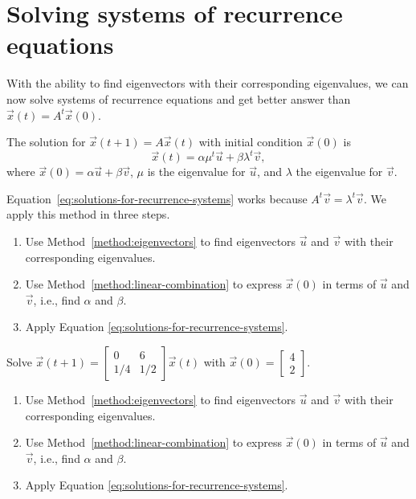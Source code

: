 \documentclass[../main.tex]{subfiles}
\begin{document}
 \section{Solving systems of recurrence equations}
With the ability to find eigenvectors with their corresponding eigenvalues, we can now solve systems of recurrence equations and get better answer than \(\vec{x}(t) = A^{t} \vec{x}(0)\).

\begin{method} \label{method:recurrences-system}
  The solution for \(\vec{x}(t + 1) = A\vec{x}(t)\) with initial condition \(\vec{x}(0)\) is
  \begin{equation} \label{eq:solutions-for-recurrence-systems}
    \vec{x}(t) = \alpha \mu^{t} \vec{u} + \beta \lambda^{t} \vec{v},
  \end{equation}
  where \(\vec{x}(0) = \alpha \vec{u} + \beta \vec{v}\), \(\mu\) is the eigenvalue for \(\vec{u}\), and \(\lambda\) the eigenvalue for \(\vec{v}\).

  Equation~\eqref{eq:solutions-for-recurrence-systems} works because \(A^{t} \vec{v} = \lambda^{t} \vec{v}\). We apply this method in three steps.
  \begin{enumerate}
    \item Use Method~\ref{method:eigenvectors} to find eigenvectors \(\vec{u}\) and \(\vec{v}\) with their corresponding eigenvalues. 
    \item Use Method~\ref{method:linear-combination} to express \(\vec{x}(0)\) in terms of \(\vec{u}\) and \(\vec{v}\), i.e., find \(\alpha\) and \(\beta\).
    \item Apply Equation \ref{eq:solutions-for-recurrence-systems}.
  \end{enumerate}
\end{method}

\begin{example} \label{eq:age-structured-recurrence-solution}
  Solve \( \vec{x}(t+1) = \begin{bmatrix} 0 & 6 \\ 1/4 & 1/2 \end{bmatrix} \vec{x}(t) \) with \(\vec{x}(0) = \begin{bmatrix} 4 \\ 2 \end{bmatrix}\).

  \begin{enumerate}[wide, label=(Step~\arabic*)]
    \item Use Method~\ref{method:eigenvectors} to find eigenvectors \(\vec{u}\) and \(\vec{v}\) with their corresponding eigenvalues. 

    \item Use Method~\ref{method:linear-combination} to express \(\vec{x}(0)\) in terms of \(\vec{u}\) and \(\vec{v}\), i.e., find \(\alpha\) and \(\beta\).


    \item Apply Equation \ref{eq:solutions-for-recurrence-systems}. 
  \end{enumerate}
\end{example}
\clearpage
\end{document}
